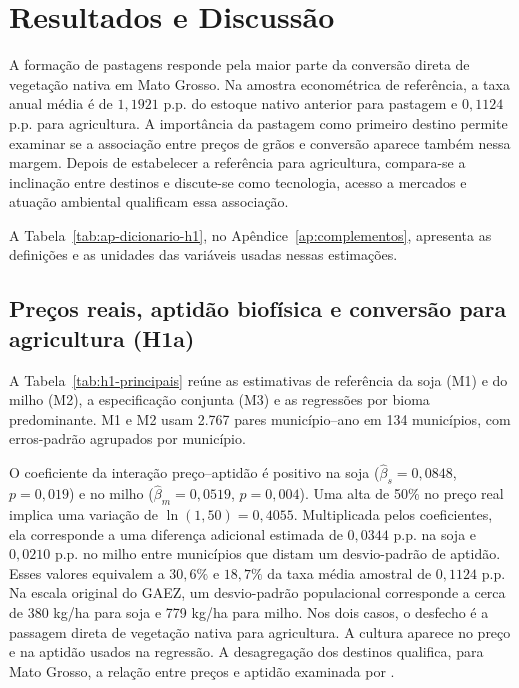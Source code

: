 \section{Resultados e Discussão}
\label{sec:discussao}

A formação de pastagens responde pela maior parte da conversão direta de vegetação nativa em Mato Grosso. Na amostra econométrica de referência, a taxa anual média é de $1{,}1921$ p.p. do estoque nativo anterior para pastagem e $0{,}1124$ p.p. para agricultura. A importância da pastagem como primeiro destino permite examinar se a associação entre preços de grãos e conversão aparece também nessa margem. Depois de estabelecer a referência para agricultura, compara-se a inclinação entre destinos e discute-se como tecnologia, acesso a mercados e atuação ambiental qualificam essa associação.

A Tabela~\ref{tab:ap-dicionario-h1}, no Apêndice~\ref{ap:complementos}, apresenta as definições e as unidades das variáveis usadas nessas estimações.

\subsection{Preços reais, aptidão biofísica e conversão para agricultura (H1a)}
\label{discussao-principais}

A Tabela~\ref{tab:h1-principais} reúne as estimativas de referência da soja (M1) e do milho (M2), a especificação conjunta (M3) e as regressões por bioma predominante. M1 e M2 usam 2.767 pares município--ano em 134 municípios, com erros-padrão agrupados por município.

O coeficiente da interação preço--aptidão é positivo na soja ($\hat\beta_s=0{,}0848$, $p=0{,}019$) e no milho ($\hat\beta_m=0{,}0519$, $p=0{,}004$). Uma alta de 50\% no preço real implica uma variação de $\ln(1{,}50)=0{,}4055$. Multiplicada pelos coeficientes, ela corresponde a uma diferença adicional estimada de $0{,}0344$ p.p. na soja e $0{,}0210$ p.p. no milho entre municípios que distam um desvio-padrão de aptidão. Esses valores equivalem a $30{,}6\%$ e $18{,}7\%$ da taxa média amostral de $0{,}1124$ p.p. Na escala original do GAEZ, um desvio-padrão populacional corresponde a cerca de 380 kg/ha para soja e 779 kg/ha para milho. Nos dois casos, o desfecho é a passagem direta de vegetação nativa para agricultura. A cultura aparece no preço e na aptidão usados na regressão. A desagregação dos destinos qualifica, para Mato Grosso, a relação entre preços e aptidão examinada por .

